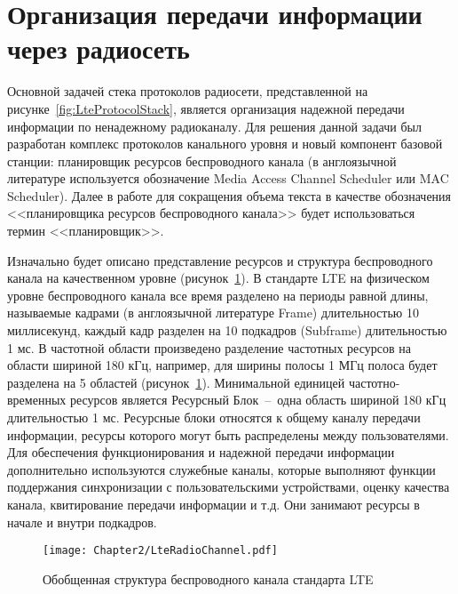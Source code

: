 \section{Организация передачи информации через радиосеть}
\label{chap2:RadioNetwork}

Основной задачей стека протоколов радиосети, представленной на рисунке~\ref{fig:LteProtocolStack}, является организация надежной передачи информации по ненадежному радиоканалу. Для решения данной задачи был разработан комплекс протоколов канального уровня и новый компонент базовой станции: планировщик ресурсов беспроводного канала (в англоязычной литературе используется обозначение Media Access Channel Scheduler или MAC Scheduler). Далее в работе для сокращения объема текста в качестве обозначения <<планировщика ресурсов беспроводного канала>> будет использоваться термин <<планировщик>>.

Изначально будет описано представление ресурсов и структура беспроводного канала на качественном уровне (рисунок~\ref{fig:LteRadioChannel}). В стандарте LTE на физическом уровне беспроводного канала все время разделено на периоды равной длины, называемые кадрами (в англоязычной литературе Frame) длительностью 10 миллисекунд, каждый кадр разделен на 10 подкадров (Subframe) длительностью 1 мс. В частотной области произведено разделение частотных ресурсов на области шириной 180 кГц, например, для ширины полосы 1 МГц полоса будет разделена на 5 областей (рисунок~\ref{fig:LteRadioChannel}). Минимальной единицей частотно-временных ресурсов является Ресурсный Блок~--~одна область шириной 180 кГц длительностью 1 мс. Ресурсные блоки относятся к общему каналу передачи информации, ресурсы которого могут быть распределены между пользователями. Для обеспечения функционирования и надежной передачи информации дополнительно используются служебные каналы, которые выполняют функции поддержания синхронизации с пользовательскими устройствами, оценку качества канала, квитирование передачи информации и т.д. Они занимают ресурсы в начале и внутри подкадров.

\begin{figure}[htbp]
\begin{center}
\texttt{[image: Chapter2/LteRadioChannel.pdf]}
\caption{Обобщенная структура беспроводного канала стандарта LTE}
\label{fig:LteRadioChannel}
\end{center}
\end{figure}

